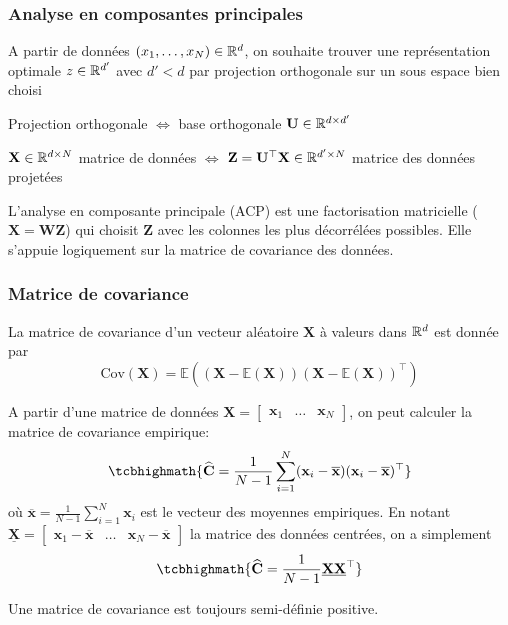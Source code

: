 \documentclass[9pt]{beamer}
\begin{document}
\begin{frame}
\frametitle{Analyse en composantes principales}

A partir de données $(x_1,\ldots,x_N) \in \mathbb{R}^d$, on souhaite trouver une \alert{représentation optimale} $z \in \mathbb{R}^{d'}$ avec $d' < d$ par \alert{projection orthogonale} sur un \alert{sous espace} bien choisi

Projection orthogonale $\iff$ base orthogonale $\mathbf{U} \in \mathbb{R}^{d \times d'}$

$\mathbf{X} \in \mathbb{R}^{d\times N}$ matrice de données $\iff$ ${\mathbf{Z}} = \mathbf{U}^\top \mathbf{X} \in \mathbb{R}^{d'\times N}$ matrice des données projetées

\vfill

\begin{tcolorbox}
L'analyse en composante principale (ACP) est une \alert{factorisation matricielle} ($\mathbf{X} = \mathbf{W} \mathbf{Z}$) qui choisit $\mathbf{Z}$ avec les colonnes les plus \alert{décorrélées} possibles. Elle s'appuie logiquement sur la matrice de covariance des données.
\end{tcolorbox}

\end{frame}




\begin{frame}
\frametitle{Matrice de covariance}

La matrice de covariance d'un vecteur aléatoire $\mathbf{X}$ à valeurs dans $\mathbb{R}^d$ est donnée par
$$
	\mathrm{Cov}(\mathbf{X}) = \mathbb{E}((\mathbf{X}-\mathbf{\mathbb{E}(X)})(\mathbf{X}-\mathbb{E}({\mathbf{X}}))^\top)
$$

A partir d'une matrice de données $\mathbf{X} = \begin{bmatrix} \mathbf{x}_1 & \ldots & \mathbf{x}_N \end{bmatrix}$, on peut calculer la matrice de covariance empirique:
$$\tcbhighmath{
\widehat{\mathbf{C}} = \frac{1}{N-1} \sum_{i=1}^N (\mathbf{x}_i - \mathbf{\overline{x}})(\mathbf{x}_i-\mathbf{\overline{x}})^\top}
$$
où $\displaystyle \overline{\mathbf{x}} = \frac{1}{N-1}\sum_{i=1}^N \mathbf{x}_i$ est le vecteur des moyennes empiriques. En notant $\underline{\mathbf{X}} = \begin{bmatrix} \mathbf{x}_1-\overline{\mathbf{x}} & \ldots & \mathbf{x}_N-\overline{\mathbf{x}} \end{bmatrix}$ la matrice des données \alert{centrées}, on a simplement
$$\tcbhighmath{
\widehat{\mathbf{C}} = \frac{1}{N-1}\underline{\mathbf{X}}\underline{\mathbf{X}}^\top}
$$

Une matrice de covariance est toujours semi-définie positive.
\end{frame}
\end{document}
